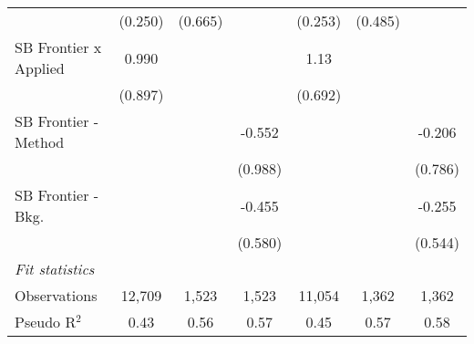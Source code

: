 \begin{tabular}{lcccccc}
                                  & (0.250)        & (0.665)       &               & (0.253)        & (0.485)       &   \\   
   SB Frontier x Applied          & 0.990          &               &               & 1.13           &               &   \\   
                                  & (0.897)        &               &               & (0.692)        &               &   \\   
   SB Frontier - Method           &                &               & -0.552        &                &               & -0.206\\   
                                  &                &               & (0.988)       &                &               & (0.786)\\   
   SB Frontier - Bkg.             &                &               & -0.455        &                &               & -0.255\\   
                                  &                &               & (0.580)       &                &               & (0.544)\\   
   \midrule
   \emph{Fit statistics}\\
   Observations                   & 12,709         & 1,523         & 1,523         & 11,054         & 1,362         & 1,362\\  
   Pseudo R$^2$                   & 0.43           & 0.56          & 0.57          & 0.45           & 0.57          & 0.58\\  
   

\end{tabular}
